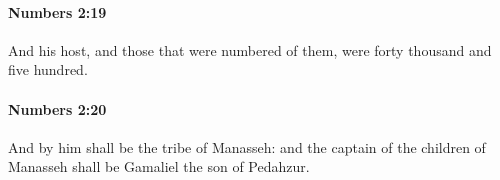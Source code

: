 		\paragraph{Numbers 2:19} %
			\label{NUMBERS-2-19}

			And his host, and those that were numbered of them, were forty thousand and five hundred.


		\paragraph{Numbers 2:20} %
			\label{NUMBERS-2-20}

			And by him shall be the tribe of Manasseh: and the captain of the children of Manasseh shall be Gamaliel the son of Pedahzur.


